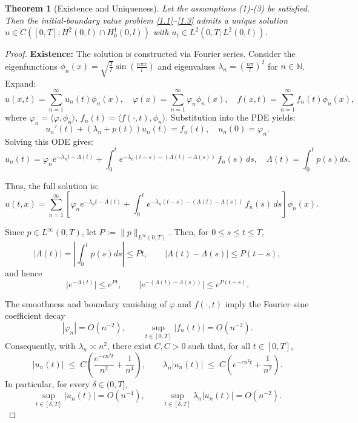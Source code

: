 \documentclass[10pt,a4paper]{amsart}
\newtheorem{theorem}{Theorem}
\begin{document}
\begin{theorem}[Existence and Uniqueness]\label{thm:direct-wellposed}
Let the assumptions (1)-(3) be satisfied. Then the initial-boundary value problem \eqref{1.1}--\eqref{1.3} admits a unique solution $u \in C ([0,T]; H^2(0,l) \cap H_0^1(0,l))$ with $u_t \in L^2(0,T; L^2(0,l))$.
\end{theorem}

\begin{proof}
\textbf{Existence:} The solution is constructed via Fourier series. Consider the eigenfunctions $\phi_n(x) = \sqrt{\frac{2}{l}} \sin\left(\frac{n\pi x}{l}\right)$ and eigenvalues $\lambda_n = \left(\frac{n\pi}{l}\right)^2$ for $n \in \mathbb{N}$. Expand:
\[
u(x,t) = \sum_{n=1}^{\infty} u_n(t) \phi_n(x), \quad
\varphi(x) = \sum_{n=1}^{\infty} \varphi_n \phi_n(x), \quad
f(x,t) = \sum_{n=1}^{\infty} f_n(t) \phi_n(x),
\]
where $\varphi_n = \langle \varphi, \phi_n \rangle$, $f_n(t) = \langle f(\cdot,t), \phi_n \rangle$. Substitution into the PDE yields:
\[
u_n'(t) + (\lambda_n + p(t))u_n(t) = f_n(t), \quad u_n(0) = \varphi_n.
\]
Solving this ODE gives:
\begin{equation}\label{sol_coeff}
u_n(t) = \varphi_n e^{-\lambda_nt-\Lambda(t)} + \int_{0}^{t} e^{-\lambda_n(t-s)-(\Lambda(t)-\Lambda(s))}\, f_n(s)\, ds, \quad  \Lambda(t) =  \int_0^t p(s)ds.
\end{equation}

Thus, the full solution is:
\begin{equation}\label{full}
u(t,x) =\sum_{n=1
}^{\infty}\left[ \varphi_n e^{-\lambda_nt-\Lambda(t)} + \int_{0}^{t} e^{-\lambda_n(t-s)-(\Lambda(t)-\Lambda(s))}\, f_n(s)\, ds\right]\phi_n(x).
\end{equation}

Since $p\in L^\infty(0,T)$, let $P:=\|p\|_{L^\infty(0,T)}$. Then, for $0\le s\le t\le T$,
\[
|\Lambda(t)| = \left|\int_0^t p(s)ds \right| \le Pt,\qquad |\Lambda(t)-\Lambda(s)|\le P(t-s),
\]
and hence
\[
\big|e^{-\Lambda(t)}\big|\le e^{Pt},\qquad \big|e^{-(\Lambda(t)-\Lambda(s))}\big|\le e^{P(t-s)}.
\]

The smoothness and boundary vanishing of $\varphi$ and $f(\cdot,t)$ imply the Fourier–sine
coefficient decay
\[
|\varphi_n|=O(n^{-2}),\qquad \sup_{t\in[0,T]}|f_n(t)|=O(n^{-2}).
\]
Consequently, with $\lambda_n\asymp n^2$, there exist $C, C>0$ such that, for all $t\in[0,T]$,
\[
|u_n(t)|\;\le\; C\!\left(\frac{e^{-c n^2 t}}{n^{2}}+\frac{1}{n^{4}}\right),
\qquad
\lambda_n|u_n(t)|\;\le\; C\!\left(e^{-c n^2 t}+\frac{1}{n^{2}}\right).
\]
In particular, for every $\delta\in(0,T]$,
\[
\sup_{t\in[\delta,T]}|u_n(t)|=O(n^{-4}),\qquad
\sup_{t\in[\delta,T]}\lambda_n|u_n(t)|=O(n^{-2}).
\]


\end{proof}
\end{document}
